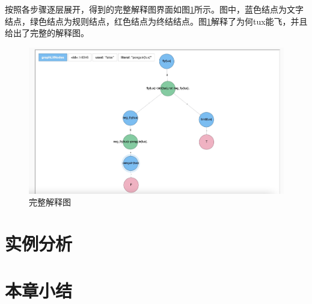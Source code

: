 按照各步骤逐层展开，得到的完整解释图界面如图\ref{fig:completeexp}所示。图中，蓝色结点为文字结点，绿色结点为规则结点，红色结点为终结结点。图\ref{fig:completeexp}解释了为何tux能飞，并且给出了完整的解释图。
\begin{figure}[htbp]
    \centering
    \includegraphics[width=0.8\linewidth]{figures/完整解释图.jpg}
    \caption{完整解释图}
    \label{fig:completeexp}
\end{figure}


\section{实例分析}


\section{本章小结}
